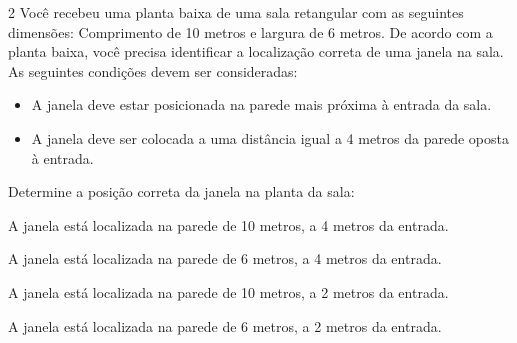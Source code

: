 \num{2} Você recebeu uma planta baixa de uma sala retangular com as seguintes
dimensões: Comprimento de 10 metros e largura de 6 metros. De acordo com a planta baixa, você precisa identificar a localização correta de uma janela na sala. As seguintes condições devem ser
consideradas:

\begin{itemize}
\item A janela deve estar posicionada na parede mais próxima à entrada da
sala. 
\item A janela deve ser colocada a uma distância igual a 4 metros da
parede oposta à entrada.
\end{itemize}

Determine a posição correta da janela na planta da sala:

\begin{escolha}[itemsep=0pt]
\item A janela está localizada na parede de 10 metros, a 4 metros da
entrada.
\item A janela está localizada na parede de 6 metros, a 4 metros da
entrada.
\item A janela está localizada na parede de 10 metros, a 2 metros da
entrada.
\item A janela está localizada na parede de 6 metros, a 2 metros da
entrada.
\end{escolha}



